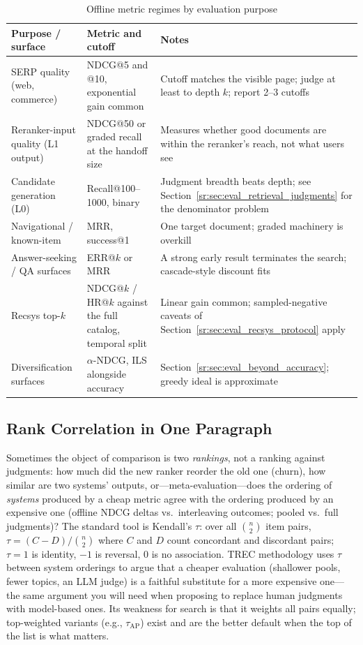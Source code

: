 \begin{table}[H]
\centering
\small
\caption{Offline metric regimes by evaluation purpose}
\label{sr:tab:ndcg_regimes}
\begin{tabularx}{\textwidth}{lXX}
\toprule
\textbf{Purpose / surface} & \textbf{Metric and cutoff} & \textbf{Notes} \\
\midrule
SERP quality (web, commerce) & NDCG@5 and @10, exponential gain common & Cutoff matches the visible page; judge at least to depth $k$; report 2--3 cutoffs \\
Reranker-input quality (L1 output) & NDCG@50 or graded recall at the handoff size & Measures whether good documents are within the reranker's reach, not what users see \\
Candidate generation (L0) & Recall@100--1000, binary & Judgment breadth beats depth; see Section~\ref{sr:sec:eval_retrieval_judgments} for the denominator problem \\
Navigational / known-item & MRR, success@1 & One target document; graded machinery is overkill \\
Answer-seeking / QA surfaces & ERR@$k$ or MRR & A strong early result terminates the search; cascade-style discount fits \\
Recsys top-$k$ & NDCG@$k$ / HR@$k$ against the full catalog, temporal split & Linear gain common; sampled-negative caveats of Section~\ref{sr:sec:eval_recsys_protocol} apply \\
Diversification surfaces & $\alpha$-NDCG, ILS alongside accuracy & Section~\ref{sr:sec:eval_beyond_accuracy}; greedy ideal is approximate \\
\bottomrule
\end{tabularx}
\end{table}

\subsection{Rank Correlation in One Paragraph}

Sometimes the object of comparison is two \textit{rankings}, not a ranking against judgments: how much did the new ranker reorder the old one (churn), how similar are two systems' outputs, or---meta-evaluation---does the ordering of \textit{systems} produced by a cheap metric agree with the ordering produced by an expensive one (offline NDCG deltas vs.\ interleaving outcomes; pooled vs.\ full judgments)? The standard tool is Kendall's $\tau$: over all $\binom{n}{2}$ item pairs, $\tau = (C - D)/\binom{n}{2}$ where $C$ and $D$ count concordant and discordant pairs; $\tau = 1$ is identity, $-1$ is reversal, $0$ is no association. TREC methodology uses $\tau$ between system orderings to argue that a cheaper evaluation (shallower pools, fewer topics, an LLM judge) is a faithful substitute for a more expensive one---the same argument you will need when proposing to replace human judgments with model-based ones. Its weakness for search is that it weights all pairs equally; top-weighted variants (e.g., $\tau_{\mathrm{AP}}$) exist and are the better default when the top of the list is what matters.


